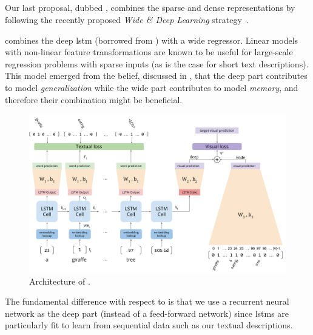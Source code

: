 \subsection{\widedeepttv{}}
\label{subsec:t2v:wd-ttv}

Our last proposal, dubbed \widedeepttv{}, combines the sparse and dense representations by following the recently proposed \emph{Wide \& Deep Learning} strategy~\cite{cheng2016wide}.

\widedeepttv{} combines the deep \gls{lstm} (borrowed from \densettv{}) with a wide regressor.
Linear models with non-linear feature transformations are known to be useful for large-scale regression problems with sparse inputs (as is the case for short text descriptions).
This model emerged from the belief, discussed in \cite{cheng2016wide}, that the deep part contributes to model \emph{generalization} while the wide part contributes to model \emph{memory}, and therefore their combination might be beneficial.

\begin{figure}
\includegraphics[width=\linewidth]{wd-t2v-arch}
\caption{Architecture of \widedeepttv{}.} \label{fig:t2v:widendeep}
\end{figure}

The fundamental difference with respect to \cite{cheng2016wide} is that we use a recurrent neural network as the deep part (instead of a feed-forward network) since \glspl{lstm} are particularly fit to learn from sequential data such as our textual descriptions.

